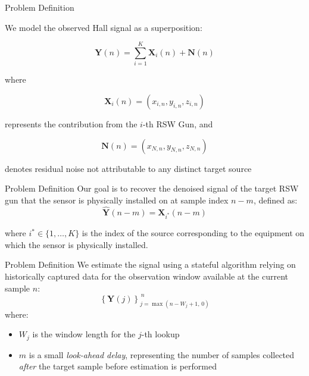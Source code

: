 \documentclass{beamer}
\begin{document}

\begin{frame}{Problem Definition}

We model the observed Hall signal as a superposition:

\[
\mathbf{Y}(n) = \sum_{i=1}^{K} \mathbf{X}_i(n) + \mathbf{N}(n)
\]

where

\[
\mathbf{X}_i(n) = (x_{i,n}, y_{i,n}, z_{i,n})
\]

represents the contribution from the $i$-th RSW Gun, and

\[
\mathbf{N}(n) = (x_{N,n}, y_{N,n}, z_{N,n})
\]

denotes residual noise not attributable to any distinct target source

\end{frame}


\begin{frame}{Problem Definition}
    Our goal is to recover the denoised signal of the target RSW gun that the sensor is physically installed on at sample index $n - m$, defined as:
    \[
    \hat{\mathbf{Y}}(n - m) = \mathbf{X}_{i^*}(n - m)
    \]
    
    where $i^* \in \{1, \ldots, K\}$ is the index of the source corresponding to the
    equipment on which the sensor is physically installed.
\end{frame}


\begin{frame}{Problem Definition}
We estimate the signal using a stateful algorithm relying on historically captured data for the observation window available at the current sample $n$:
\[
\left\{ \mathbf{Y}(j) \right\}_{j = \max(n - W_j + 1,\, 0)}^{\,n}
\]
where:
\begin{itemize}
    \item $W_j$ is the window length for the $j$-th lookup
    \item $m$ is a small \textit{look-ahead delay}, representing the number of samples collected \emph{after} the target sample before estimation is performed
\end{itemize}
\end{frame}
\end{document}
